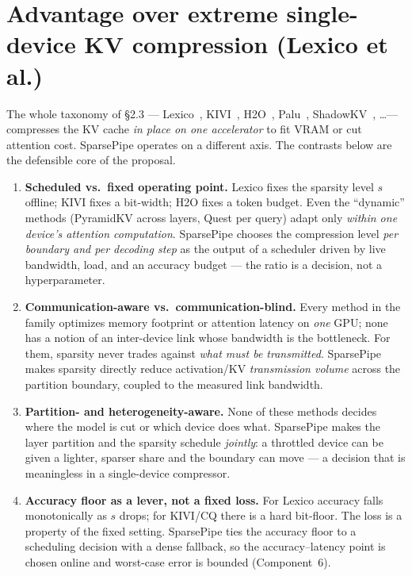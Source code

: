 \documentclass[11pt]{article}
\newcommand{\term}[1]{\textbf{\color{accent!85!black}#1}}
\begin{document}
\section{Advantage over extreme single-device KV compression (Lexico et al.)}
\label{sec:vslexico}

The whole taxonomy of \S2.3 --- Lexico~\cite{lexico}, KIVI~\cite{kivi}, H2O~\cite{h2o},
Palu~\cite{palu}, ShadowKV~\cite{shadowkv}, \dots --- compresses the KV cache \emph{in place
on one accelerator} to fit VRAM or cut attention cost. SparsePipe operates on a different
axis. The contrasts below are the defensible core of the proposal.

\begin{enumerate}[leftmargin=1.6em,itemsep=3pt]
\item \term{Scheduled vs.\ fixed operating point.} Lexico fixes the sparsity level $s$
offline; KIVI fixes a bit-width; H2O fixes a token budget. Even the ``dynamic'' methods
(PyramidKV across layers, Quest per query) adapt only \emph{within one device's attention
computation}. SparsePipe chooses the compression level \emph{per boundary and per decoding
step} as the output of a scheduler driven by live bandwidth, load, and an accuracy budget ---
the ratio is a decision, not a hyperparameter.

\item \term{Communication-aware vs.\ communication-blind.} Every method in the family
optimizes memory footprint or attention latency on \emph{one} GPU; none has a notion of an
inter-device link whose bandwidth is the bottleneck. For them, sparsity never trades against
\emph{what must be transmitted}. SparsePipe makes sparsity directly reduce
activation/KV \emph{transmission volume} across the partition boundary, coupled to the
measured link bandwidth.

\item \term{Partition- and heterogeneity-aware.} None of these methods decides where the
model is cut or which device does what. SparsePipe makes the layer partition and the sparsity
schedule \emph{jointly}: a throttled device can be given a lighter, sparser share and the
boundary can move --- a decision that is meaningless in a single-device compressor.

\item \term{Accuracy floor as a lever, not a fixed loss.} For Lexico accuracy falls
monotonically as $s$ drops; for KIVI/CQ there is a hard bit-floor. The loss is a property of
the fixed setting. SparsePipe ties the accuracy floor to a scheduling decision with a dense
fallback, so the accuracy--latency point is chosen online and worst-case error is bounded
(Component~6).


\end{enumerate}
\end{document}
